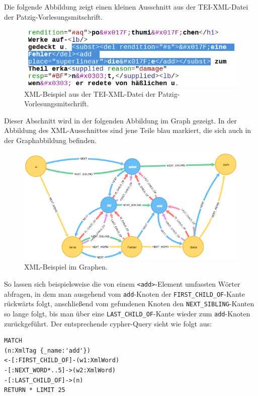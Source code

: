 \documentclass[ngerman,]{scrreprt}
\begin{document}
Die folgende Abbildung zeigt einen kleinen Ausschnitt aus der TEI-XML-Datei der Patzig-Vorlesungsmitschrift.

\begin{figure}
\centering
\includegraphics{Bilder/TEI2Graph/subst-xml-Beispiel.png}
\caption{XML-Beispiel aus der TEI-XML-Datei der Patzig-Vorlesungsmitschrift.}
\end{figure}

Dieser Abschnitt wird in der folgenden Abbildung im Graph gezeigt. In der Abbildung des XML-Ausschnittes sind jene Teile blau markiert, die sich auch in der Graphabbildung befinden.

\begin{figure}
\centering
\includegraphics{Bilder/TEI2Graph/xml-importer-datenmodell.png}
\caption{XML-Beispiel im Graphen.}
\end{figure}

So lassen sich beispielsweise die von einem \texttt{\textless{}add\textgreater{}}-Element umfassten Wörter abfragen, in dem man ausgehend vom \texttt{add}-Knoten der \texttt{FIRST\_CHILD\_OF}-Kante rückwärts folgt, anschließend vom gefundenen Knoten den \texttt{NEXT\_SIBLING}-Kanten so lange folgt, bis man über eine \texttt{LAST\_CHILD\_OF}-Kante wieder zum \texttt{add}-Knoten zurückgeführt. Der entsprechende cypher-Query sieht wie folgt aus:

\begin{verbatim}
MATCH
(n:XmlTag {_name:'add'})
<-[:FIRST_CHILD_OF]-(w1:XmlWord)
-[:NEXT_WORD*..5]->(w2:XmlWord)
-[:LAST_CHILD_OF]->(n)
RETURN * LIMIT 25
\end{verbatim}
\end{document}
